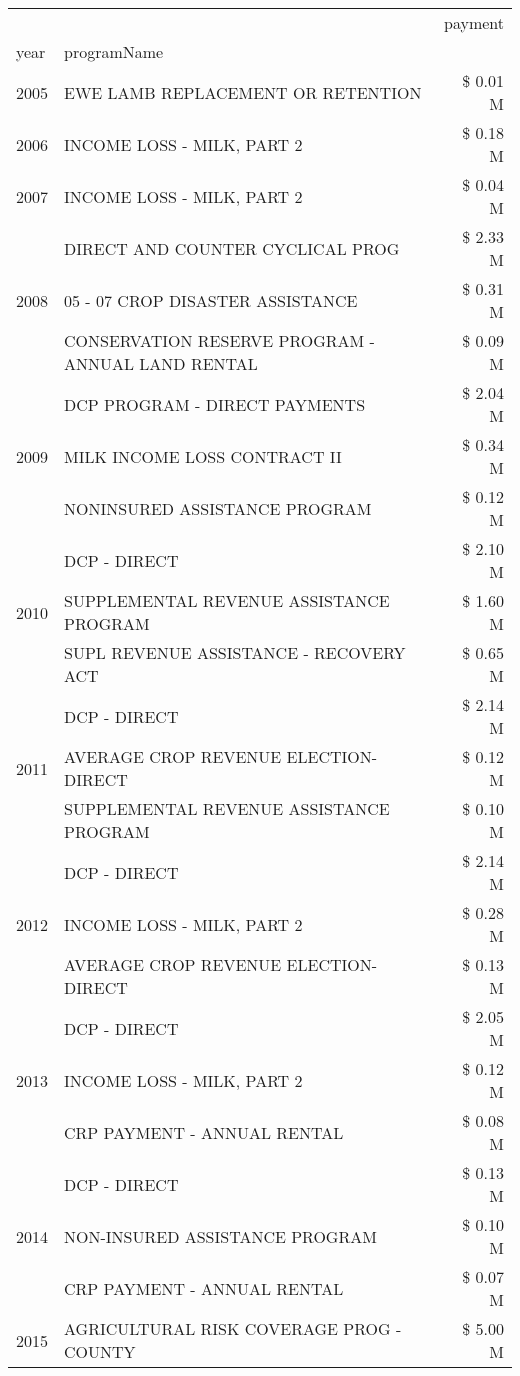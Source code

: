 \begin{tabular}{llr}
\toprule
 &  & payment \\
year & programName &  \\
\midrule
2005 & EWE LAMB REPLACEMENT OR RETENTION & \$ 0.01 M \\
\cline{1-3}
2006 & INCOME LOSS - MILK, PART 2 & \$ 0.18 M \\
\cline{1-3}
2007 & INCOME LOSS - MILK, PART 2 & \$ 0.04 M \\
\cline{1-3}
\multirow[t]{3}{*}{2008} & DIRECT AND COUNTER CYCLICAL PROG & \$ 2.33 M \\
 & 05 - 07 CROP DISASTER ASSISTANCE & \$ 0.31 M \\
 & CONSERVATION RESERVE PROGRAM - ANNUAL LAND RENTAL & \$ 0.09 M \\
\cline{1-3}
\multirow[t]{3}{*}{2009} & DCP PROGRAM - DIRECT PAYMENTS & \$ 2.04 M \\
 & MILK INCOME LOSS CONTRACT II & \$ 0.34 M \\
 & NONINSURED ASSISTANCE PROGRAM & \$ 0.12 M \\
\cline{1-3}
\multirow[t]{3}{*}{2010} & DCP - DIRECT & \$ 2.10 M \\
 & SUPPLEMENTAL REVENUE ASSISTANCE PROGRAM & \$ 1.60 M \\
 & SUPL REVENUE ASSISTANCE - RECOVERY ACT & \$ 0.65 M \\
\cline{1-3}
\multirow[t]{3}{*}{2011} & DCP - DIRECT & \$ 2.14 M \\
 & AVERAGE CROP REVENUE ELECTION-DIRECT & \$ 0.12 M \\
 & SUPPLEMENTAL REVENUE ASSISTANCE PROGRAM & \$ 0.10 M \\
\cline{1-3}
\multirow[t]{3}{*}{2012} & DCP - DIRECT & \$ 2.14 M \\
 & INCOME LOSS - MILK, PART 2 & \$ 0.28 M \\
 & AVERAGE CROP REVENUE ELECTION-DIRECT & \$ 0.13 M \\
\cline{1-3}
\multirow[t]{3}{*}{2013} & DCP - DIRECT & \$ 2.05 M \\
 & INCOME LOSS - MILK, PART 2 & \$ 0.12 M \\
 & CRP PAYMENT - ANNUAL RENTAL & \$ 0.08 M \\
\cline{1-3}
\multirow[t]{3}{*}{2014} & DCP - DIRECT & \$ 0.13 M \\
 & NON-INSURED ASSISTANCE PROGRAM & \$ 0.10 M \\
 & CRP PAYMENT - ANNUAL RENTAL & \$ 0.07 M \\
\cline{1-3}
\multirow[t]{3}{*}{2015} & AGRICULTURAL RISK COVERAGE PROG - COUNTY & \$ 5.00 M \\

\end{tabular}
